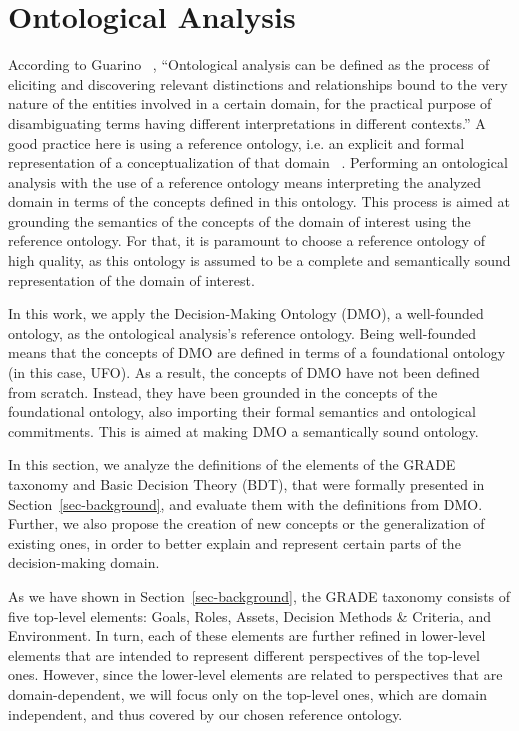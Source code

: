 \section{Ontological Analysis}
\label{sec-ontology}
According to Guarino ~\cite{ontological-analysis}, “Ontological analysis can be defined as the process of eliciting and discovering relevant distinctions and relationships bound to the very nature of the entities involved in a certain domain, for the practical purpose of disambiguating terms having different interpretations in different contexts.” A good practice here is using a reference ontology, i.e. an explicit and formal representation of a conceptualization of that domain ~\cite{guizzardi:phdthesis05}. Performing an ontological analysis with the use of a reference ontology means interpreting the analyzed domain in terms of the concepts defined in this ontology. This process is aimed at grounding the semantics of the concepts of the domain of interest using the reference ontology. For that, it is paramount to choose a reference ontology of high quality, as this ontology is assumed to be a complete and semantically sound representation of the domain of interest.

In this work, we apply the Decision-Making Ontology (DMO), a well-founded ontology, as the ontological analysis's reference ontology.  Being well-founded means that the concepts of DMO are defined in terms of a foundational ontology (in this case, UFO). As a result, the concepts of DMO have not been defined from scratch. Instead, they have been grounded in the concepts of the foundational ontology, also importing their formal semantics and ontological commitments. This is aimed at making DMO a semantically sound ontology.

In this section, we analyze the definitions of the elements of the GRADE taxonomy and Basic Decision Theory (BDT), that were formally presented in Section~\ref{sec-background}, and evaluate them with the definitions from DMO. Further, we also propose the creation of new concepts or the generalization of existing ones, in order to better explain and represent certain parts of the decision-making domain. 

As we have shown in Section~\ref{sec-background}, the GRADE taxonomy consists of five top-level elements: Goals, Roles, Assets, Decision Methods \& Criteria, and Environment. In turn, each of these elements are further refined in lower-level elements that are intended to represent different perspectives of the top-level ones. However, since the lower-level elements are related to perspectives that are domain-dependent, we will focus only on the top-level ones, which are domain independent, and thus covered by our chosen reference ontology.

